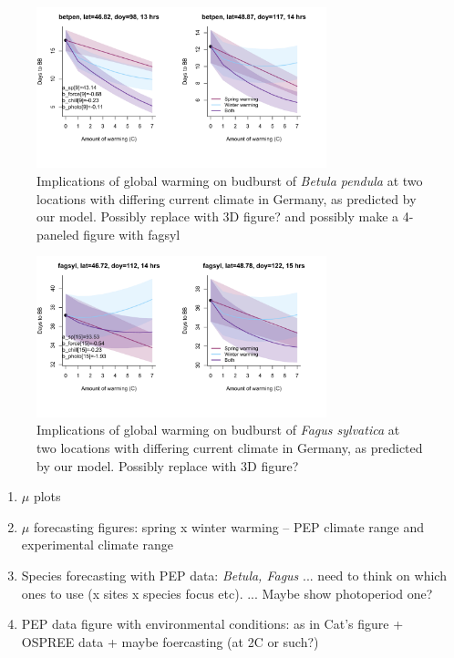 \documentclass[11pt,letter]{article}
\begin{document}
\newpage

\begin{figure}[h!]
\centering
\noindent \includegraphics[width=0.75\textwidth]{..//..//analyses/bb_analysis/figures/tempforecast_betpen_minmaxlat_PEPBB_wdl.pdf}
\caption{Implications of global warming on budburst of \emph{Betula pendula} at two locations with differing current climate in Germany, as predicted by our model. Possibly replace with 3D figure? and possibly make a 4-paneled figure with fagsyl}
\label{fig:fore}
\end{figure}
\begin{figure}[h!]
\centering
\noindent \includegraphics[width=0.75\textwidth]{..//..//analyses/bb_analysis/figures/tempforecast_fagsyl_minmaxlat_PEPBB_wdl.pdf}
\caption{Implications of global warming on budburst of \emph{Fagus sylvatica} at two locations with differing current climate in Germany, as predicted by our model. Possibly replace with 3D figure?}
\label{fig:forefs}
\end{figure}

\newpage
\begin{enumerate}
\item $\mu$ plots


\item  $\mu$ forecasting figures: spring x winter warming -- PEP climate range and experimental climate range
\item Species forecasting with PEP data: \emph{Betula, Fagus} ... need to think on which ones to use (x sites x species focus etc). ... Maybe show photoperiod one?
\item PEP data figure with environmental conditions: as in Cat's figure + OSPREE data + maybe foercasting (at 2C or such?)
\end{enumerate}
\end{document}

